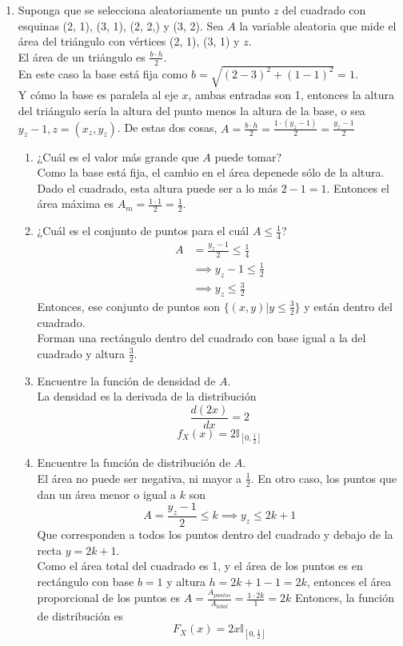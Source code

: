 \documentclass[12pt,a4paper]{report}
\begin{document}
\begin{enumerate}
		\item {
			Suponga que se selecciona aleatoriamente un punto $z$ del cuadrado con
			esquinas (2, 1), (3, 1), (2, 2,) y (3, 2). Sea $A$ la variable aleatoria
			que mide el área del triángulo con vértices (2, 1), (3, 1) y $z$.\\
			El área de un triángulo es $\frac{b\cdot h}{2}$. \\
			En este caso la base está fija como $b = \sqrt{(2-3)^2+(1-1)^2} = 1$.\\
			Y cómo la base es paralela al eje $x$, ambas entradas son 1,
			entonces la altura del triángulo sería la altura del punto menos la
			altura de la base, o sea $y_z-1, z = (x_z, y_z)$.
			De estas dos cosas, $A = \frac{b \cdot h}{2} = \frac{1 \cdot(y_z-1)}{2}
			= \frac{y_z-1}{2}$
			\begin{enumerate}
				\item {
					¿Cuál es el valor más grande que $A$ puede tomar?\\
					Como la base está fija, el cambio en el área depenede sólo
					de la altura.\\
					Dado el cuadrado, esta altura puede ser a lo más $2-1 = 1$.
					Entonces el área máxima es $A_m = \frac{1\cdot 1}{2} = \frac{1}{2}$.
				}
				\item {
					¿Cuál es el conjunto de puntos para el cuál $A \leq \frac{1}{4}$?
					\begin{align*}
						A &= \frac{y_z-1}{2} \leq \frac{1}{4}\\
						  &\implies y_z-1 \leq \frac{1}{2}\\
						  &\implies y_z \leq \frac{3}{2}
					\end{align*}
					Entonces, ese conjunto de puntos son $\{(x, y) | y \leq \frac{3}{2}\}$
					y están dentro del cuadrado.\\
					Forman una rectángulo dentro del cuadrado con base igual a
					la del cuadrado y altura $\frac{3}{2}$.
				}
				\item {
					Encuentre la función de densidad de $A$.\\
					La densidad es la derivada de la distribución
					\[\frac{d(2x)}{dx} = 2\]
					\[f_X(x) = 2 \mathbb{I}_{[0, \frac{1}{2}]}\]

				}
				\item {
					Encuentre la función de distribución de $A$.\\
					El área no puede ser negativa, ni mayor a $\frac{1}{2}$.
					En otro caso, los puntos que dan un área menor o igual a $k$
					son
					\[A = \frac{y_z-1}{2} \leq k \implies y_z \leq 2k + 1\]
					Que corresponden a todos los puntos dentro del cuadrado y
					debajo de la recta $y = 2k+1$.\\
					Como el área total del cuadrado es 1, y el área de los
					puntos es en rectángulo con base $b = 1$
					y altura $h = 2k+1-1 = 2k$, entonces el área proporcional de
					los puntos es
					$A = \frac{A_{puntos}}{A_{total}} = \frac{1 \cdot 2k}{1} = 2k$
					Entonces, la función de distribución es
					\[F_X(x) = 2x \mathbb{I}_{[0, \frac{1}{2}]}\]
				}
			\end{enumerate}
		}


\end{enumerate}
\end{document}
